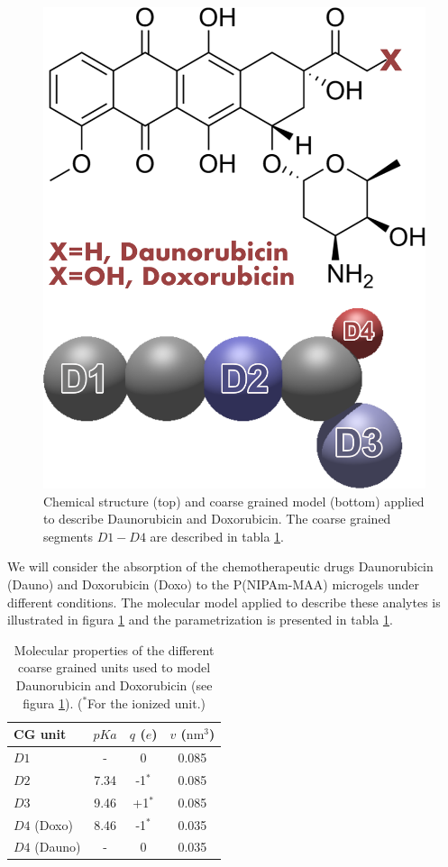 \begin{figure}[!tb]
\centering
\includegraphics[width=0.35\linewidth]{Figures/graph-gel/dauno-doxo.png}
\caption{Chemical structure (top) and coarse grained model (bottom) applied to describe Daunorubicin and Doxorubicin.
The coarse grained segments $D1-D4$ are described in tabla \ref{table:drugs}.}
\label{fig:dauno-doxo}
\end{figure}



We will consider the absorption of the chemotherapeutic drugs Daunorubicin (Dauno) and Doxorubicin (Doxo) to the P(NIPAm-MAA) microgels under different conditions.
The molecular model applied to describe these analytes is illustrated in figura  \ref{fig:dauno-doxo} and the parametrization is presented in tabla \ref{table:drugs}.\addcite[PerezChavez2020]


\begin{table}
\centering
\begin{tabular}{|lccc|}
    \hline
    {CG unit} & {$pKa$} & {$q$ ($e$)} & {$v$ ($\text{nm}^3$)} \\
      \hline
$D1$ & - & 0 & 0.085\\
$D2$ & 7.34 & -1$^\ast$ & 0.085\\
$D3$ & 9.46 & +1$^\ast$ & 0.085\\ 
$D4$ (Doxo) & 8.46 & -1$^\ast$ & 0.035\\
$D4$ (Dauno) & - & 0 & 0.035 \\
    \hline
  \end{tabular}
 \caption{Molecular properties of the different coarse grained units used to model Daunorubicin and Doxorubicin (see figura \ref{fig:dauno-doxo}).
\footnotesize ($^\ast$For the ionized unit.)}
\label{table:drugs} 
\end{table}




